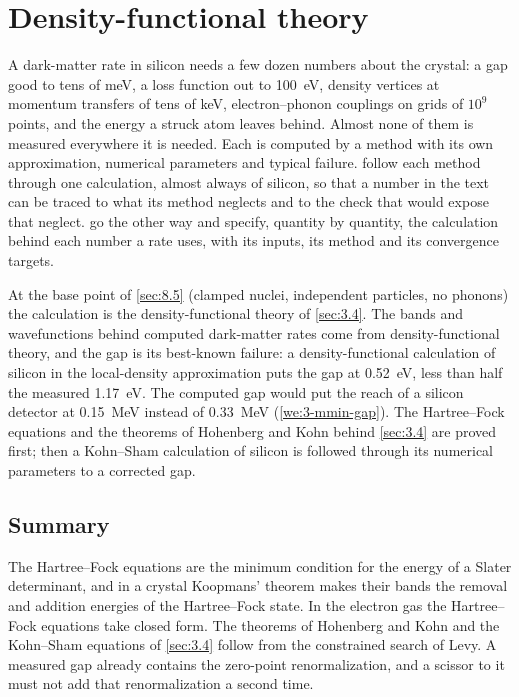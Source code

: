 \chapter{Density-functional theory}\label{chap:23}

A dark-matter rate in silicon needs a few dozen numbers about the crystal: a gap good to tens of meV, a loss function out to \SI{100}{eV}, density vertices at momentum transfers of tens of keV, electron--phonon couplings on grids of $10^9$ points, and the energy a struck atom leaves behind. Almost none of them is measured everywhere it is needed. Each is computed by a method with its own approximation, numerical parameters and typical failure.  follow each method through one calculation, almost always of silicon, so that a number in the text can be traced to what its method neglects and to the check that would expose that neglect.  go the other way and specify, quantity by quantity, the calculation behind each number a rate uses, with its inputs, its method and its convergence targets.

At the base point of \cref{sec:8.5} (clamped nuclei, independent particles, no phonons) the calculation is the density-functional theory of \cref{sec:3.4}. The bands and wavefunctions behind computed dark-matter rates come from density-functional theory, and the gap is its best-known failure: a density-functional calculation of silicon in the local-density approximation puts the gap at \SI{0.52}{eV}, less than half the measured \SI{1.17}{eV}. The computed gap would put the reach of a silicon detector at \SI{0.15}{MeV} instead of \SI{0.33}{MeV} (\cref{we:3-mmin-gap}). The Hartree--Fock equations and the theorems of Hohenberg and Kohn behind \cref{sec:3.4} are proved first; then a Kohn--Sham calculation of silicon is followed through its numerical parameters to a corrected gap.






\section*{Summary}

The Hartree--Fock equations are the minimum condition for the energy of a Slater determinant, and in a crystal Koopmans' theorem makes their bands the removal and addition energies of the Hartree--Fock state. In the electron gas the Hartree--Fock equations take closed form. The theorems of Hohenberg and Kohn and the Kohn--Sham equations of \cref{sec:3.4} follow from the constrained search of Levy. A measured gap already contains the zero-point renormalization, and a scissor to it must not add that renormalization a second time.

